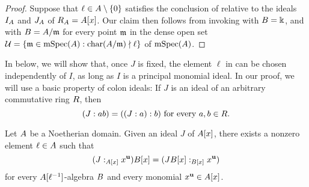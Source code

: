 \documentclass{article}
\begin{document}
 \begin{proof}
    Suppose that $\ell \in A \setminus \{0\}$ satisfies the conclusion of  relative to the ideals $I_A$ and $J_A$ of $R_A=A[x]$.  Our claim then follows from invoking  with $B=\Bbbk$, and with $B=A/\mathfrak{m}$ for every point $\mathfrak{m}$ in the dense open set $\mathcal{U} = \{\mathfrak{m} \in \operatorname{mSpec}(A) : \operatorname{char}(A/\mathfrak{m}) \nmid \ell\}$ of $\operatorname{mSpec}(A)$. 
\end{proof}

In  {below, we will show that, once $J$ is fixed, the element} $\ell$ in  can be chosen independently of $I$, {as long as $I$ is a principal monomial ideal.   In our proof, we will use a basic property of colon ideals:  If $J$ is an ideal of an arbitrary commutative ring $R$, then}
\begin{equation}
\label{iterated colon: e}
 (J: ab) = ((J: a): b) \text{ for every } a,b \in R.
\end{equation}

\begin{corollary}
   \label{all monomial colons: C} 
   Let $A$ be a Noetherian domain.
   Given an ideal $J$ of $A[x]$, there exists a nonzero element $\ell \in A$ such that
   \[ (J:_{A[x]} x^{\mathbf{u}}) B[x] = (J B[x]:_{B[x]} x^{\mathbf{u}})\]
   for every $A[\ell^{-1}]$-algebra $B$ and every monomial $x^{\mathbf{u}} \in A[x]$.   
\end{corollary}
\end{document}

